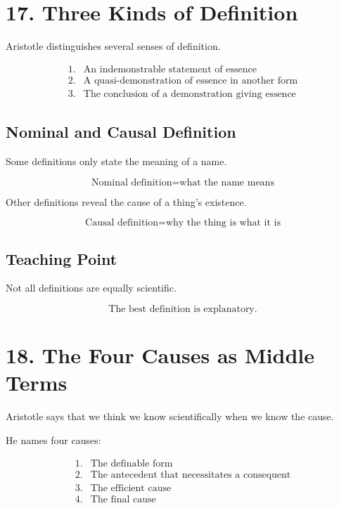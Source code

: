 \documentclass[12pt]{article}
\begin{document}
\section*{17. Three Kinds of Definition}

Aristotle distinguishes several senses of definition.

\[
\begin{array}{ll}
1. & \text{An indemonstrable statement of essence} \\
2. & \text{A quasi-demonstration of essence in another form} \\
3. & \text{The conclusion of a demonstration giving essence}
\end{array}
\]

\subsection*{Nominal and Causal Definition}

Some definitions only state the meaning of a name.

\[
\text{Nominal definition} = \text{what the name means}
\]

Other definitions reveal the cause of a thing's existence.

\[
\text{Causal definition} = \text{why the thing is what it is}
\]

\subsection*{Teaching Point}

Not all definitions are equally scientific.

\[
\boxed{
\text{The best definition is explanatory.}
}
\]

\section*{18. The Four Causes as Middle Terms}

Aristotle says that we think we know scientifically when we know the cause.

He names four causes:

\[
\begin{array}{ll}
1. & \text{The definable form} \\
2. & \text{The antecedent that necessitates a consequent} \\
3. & \text{The efficient cause} \\
4. & \text{The final cause}
\end{array}
\]
\end{document}
